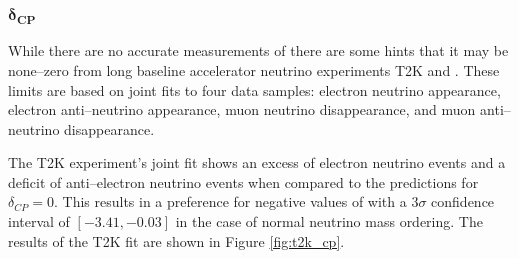 \subsubsection*{$\boldsymbol{\delta_{CP}}$}
While there are no accurate measurements of \dcp{} there are some hints that it
may be none--zero from long baseline accelerator neutrino experiments T2K and
\nova{}. These limits are based on joint fits to four data samples: electron
neutrino appearance, electron anti--neutrino appearance, muon neutrino
disappearance, and muon anti--neutrino disappearance.

The T2K experiment's joint fit shows an excess of electron neutrino events and 
a deficit of anti--electron neutrino events when compared to the predictions 
for \(\delta_{CP} = 0\). This results in a preference for negative values of 
\dcp{} with a \(3\sigma\) confidence interval of \([-3.41, -0.03]\) in the 
case of normal neutrino mass ordering. The results of the T2K fit are shown 
in Figure \ref{fig:t2k_cp}\cite{Abe2019}.

